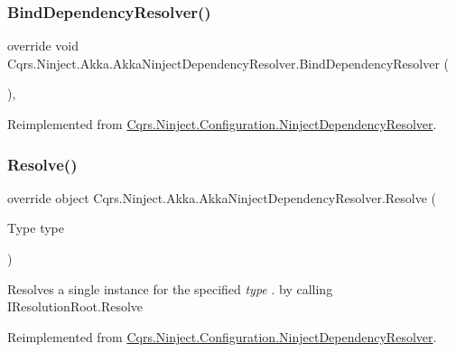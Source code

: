 \subsubsection{\texorpdfstring{Bind\+Dependency\+Resolver()}{BindDependencyResolver()}}
{\footnotesize\ttfamily override void Cqrs.\+Ninject.\+Akka.\+Akka\+Ninject\+Dependency\+Resolver.\+Bind\+Dependency\+Resolver (\begin{DoxyParamCaption}{ }\end{DoxyParamCaption})\hspace{0.3cm}{\ttfamily [protected]}, {\ttfamily [virtual]}}



Reimplemented from \hyperlink{classCqrs_1_1Ninject_1_1Configuration_1_1NinjectDependencyResolver_a2b663d936fcded5f679623bf0b0393e6_a2b663d936fcded5f679623bf0b0393e6}{Cqrs.\+Ninject.\+Configuration.\+Ninject\+Dependency\+Resolver}.

\mbox{\label{classCqrs_1_1Ninject_1_1Akka_1_1AkkaNinjectDependencyResolver_adace29de71f10e34e952bd41e48106a6_adace29de71f10e34e952bd41e48106a6}} 
\subsubsection{\texorpdfstring{Resolve()}{Resolve()}\hspace{0.1cm}{\footnotesize\ttfamily [1/2]}}
{\footnotesize\ttfamily override object Cqrs.\+Ninject.\+Akka.\+Akka\+Ninject\+Dependency\+Resolver.\+Resolve (\begin{DoxyParamCaption}\item[{Type}]{type }\end{DoxyParamCaption})\hspace{0.3cm}{\ttfamily [virtual]}}



Resolves a single instance for the specified {\itshape type} . by calling I\+Resolution\+Root.\+Resolve 



Reimplemented from \hyperlink{classCqrs_1_1Ninject_1_1Configuration_1_1NinjectDependencyResolver_ab9da7f1556cc1ef205d03d3ff62017c0_ab9da7f1556cc1ef205d03d3ff62017c0}{Cqrs.\+Ninject.\+Configuration.\+Ninject\+Dependency\+Resolver}.

